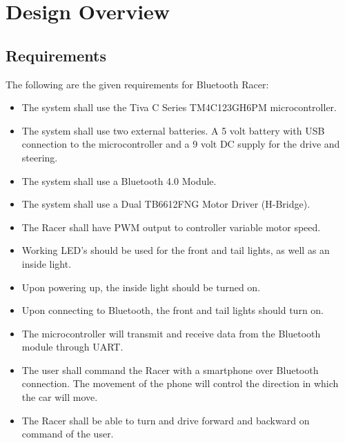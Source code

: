 \documentclass[12pt]{article}
\begin{document}
\section{Design Overview}
\subsection{Requirements}
The following are the given requirements for Bluetooth Racer:
\begin{itemize}
\item The system shall use the Tiva C Series TM4C123GH6PM microcontroller.
\item The system shall use two external batteries. A 5 volt battery with USB connection to the microcontroller and a 9 volt DC supply for the drive and steering.
\item The system shall use a Bluetooth 4.0 Module.
\item The system shall use a Dual TB6612FNG Motor Driver (H-Bridge).
\item The Racer shall have PWM output to controller variable motor speed.
\item Working LED’s should be used for the front and tail lights, as well as an inside light.
\item Upon powering up, the inside light should be turned on. 
\item Upon connecting to Bluetooth, the front and tail lights should turn on. 
\item The microcontroller will transmit and receive data from the Bluetooth module through UART.
\item The user shall command the Racer with a smartphone over Bluetooth connection. The movement of the phone will control the direction in which the car will move.
\item The Racer shall be able to turn and drive forward and backward on command of the user.
\end{itemize}  
\end{document}
